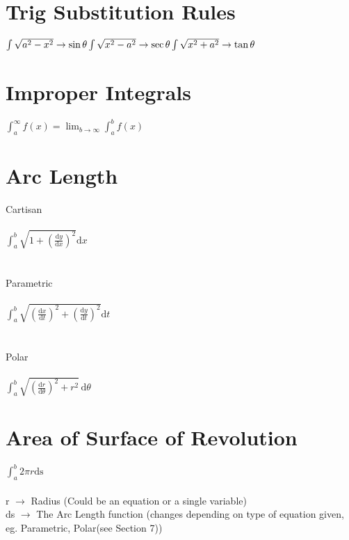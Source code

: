 \documentclass[11pt]{article} %
\begin{document}
\section{Trig Substitution Rules}
\begin{math}
\int \sqrt {a^{2}-x^{2}} \rightarrow \sin \theta \\
\\
\int \sqrt {x^{2}-a^{2}} \rightarrow \sec \theta \\
\\
\int \sqrt {x^{2}+a^{2}} \rightarrow \tan \theta \\
\end{math}
\section{Improper Integrals}
\begin{math}
\int_{a}^{\infty } f(x) = \lim_{b \to \infty}\int_{a}^{b} f(x)
\end{math}
\section{Arc Length}
Cartisan \\
\\
\begin{math}
\int_{a}^{b} \sqrt{1+\left ( \frac{\mathrm{d} y}{\mathrm{d} x} \right )^{2}} \mathrm{d} x 
\end{math} \\
\\
\\
Parametric \\
\\
\begin{math}
\int_{a}^{b} \sqrt{\left ( \frac{\mathrm{d} x}{\mathrm{d} t} \right )^{2}+\left ( \frac{\mathrm{d} y}{\mathrm{d} t} \right )^{2}} \mathrm{d} t 
\end{math} \\
\\
\\
Polar \\
\\
\begin{math}
\int_{a}^{b} \sqrt{\left ( \frac{\mathrm{d} r}{\mathrm{d} \theta} \right )^{2}+r^{2}} \, \mathrm{d} \theta
\end{math} \\
\section{Area of Surface of Revolution}
\begin{math}
\int_{a}^{b}2\pi r \mathrm{ds}
\end{math} \\
\\
r 
\begin{math}
\rightarrow
\end{math}
Radius (Could be an equation or a single variable) \\
ds
\begin{math}
\rightarrow
\end{math}
The Arc Length function (changes depending on type of equation given, eg. Parametric, Polar(see Section 7))
\end{document}
